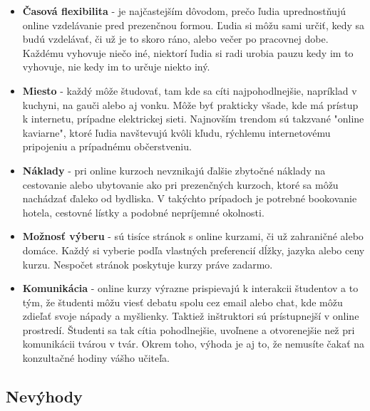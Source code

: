 \documentclass[10pt,twoside,slovak,a4paper]{article}
\begin{document}
\begin{itemize}
  \item \textbf{Časová flexibilita} - je najčastejším dôvodom, prečo ľudia uprednostňujú online vzdelávanie pred prezenčnou formou. Ľudia si môžu sami určiť, kedy sa budú vzdelávať, či už je to skoro ráno, alebo večer po pracovnej dobe. Každému vyhovuje niečo iné, niektorí ľudia si radi urobia pauzu kedy im to vyhovuje, nie kedy im to určuje niekto iný.
  \item \textbf{Miesto} - každý môže študovať, tam kde sa cíti najpohodlnejšie, napríklad v kuchyni, na gauči alebo aj vonku. Môže byť prakticky všade, kde má prístup k internetu, prípadne elektrickej sieti. Najnovším trendom sú takzvané "online kaviarne", ktoré ľudia navštevujú kvôli kľudu, rýchlemu internetovému pripojeniu a prípadnému občerstveniu.
  \item \textbf{Náklady} - pri online kurzoch nevznikajú ďalšie zbytočné náklady na  cestovanie alebo ubytovanie ako pri prezenčných kurzoch, ktoré sa môžu nachádzať ďaleko od bydliska. V takýchto prípadoch je potrebné bookovanie hotela, cestovné lístky a podobné nepríjemné okolnosti.
  \item \textbf{Možnosť výberu} - sú tisíce stránok s online kurzami, či už zahraničné alebo domáce. Každý si vyberie podľa vlastných preferencií dĺžky, jazyka alebo ceny kurzu. Nespočet stránok poskytuje kurzy práve zadarmo.
  \item \textbf{Komunikácia} - online kurzy výrazne prispievajú k interakcii študentov a to tým, že študenti môžu viesť debatu spolu cez email alebo chat, kde môžu zdieľať svoje nápady a myšlienky. Taktiež inštruktori sú prístupnejší v online prostredí. Študenti sa tak cítia pohodlnejšie, uvoľnene a otvorenejšie než pri komunikácii tvárou v tvár. Okrem toho, výhoda je aj to, že nemusíte čakať na konzultačné hodiny vášho učiteľa.
\end{itemize}

\subsection{Nevýhody}
\end{document}
